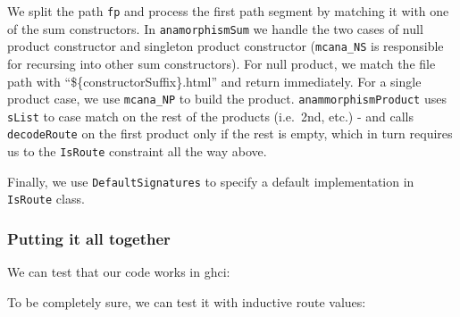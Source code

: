 We split the path \texttt{fp} and process the first path segment by
matching it with one of the sum constructors. In \texttt{anamorphismSum}
we handle the two cases of null product constructor and singleton
product constructor (\texttt{mcana\_NS} is responsible for recursing
into other sum constructors). For null product, we match the file path
with ``\$\{constructorSuffix\}.html'' and return immediately. For a
single product case, we use \texttt{mcana\_NP} to build the product.
\texttt{anammorphismProduct} uses \texttt{sList} to case match on the
rest of the products (i.e.~2nd, etc.) - and calls \texttt{decodeRoute}
on the first product only if the rest is empty, which in turn requires
us to the \texttt{IsRoute} constraint all the way above.

Finally, we use \texttt{DefaultSignatures} to specify a default
implementation in \texttt{IsRoute} class.

\hypertarget{putting-it-all-together}{%
\subsubsection{Putting it all together}\label{putting-it-all-together}}

We can test that our code works in ghci:

\begin{Shaded}
\begin{Highlighting}[]
\OperatorTok{\textgreater{}}   
\OperatorTok{\textgreater{}}
\OperatorTok{\textgreater{}} \OperatorTok{$}
 
\end{Highlighting}
\end{Shaded}

To be completely sure, we can test it with inductive route values:

\begin{Shaded}
\begin{Highlighting}[]
\OperatorTok{\textgreater{}}\OperatorTok{$}  \OperatorTok{$}  
\OperatorTok{\textgreater{}} 
\NormalTok{ (}\NormalTok{ (} \NormalTok{))}
\OperatorTok{\textgreater{}} 
\end{Highlighting}
\end{Shaded}


